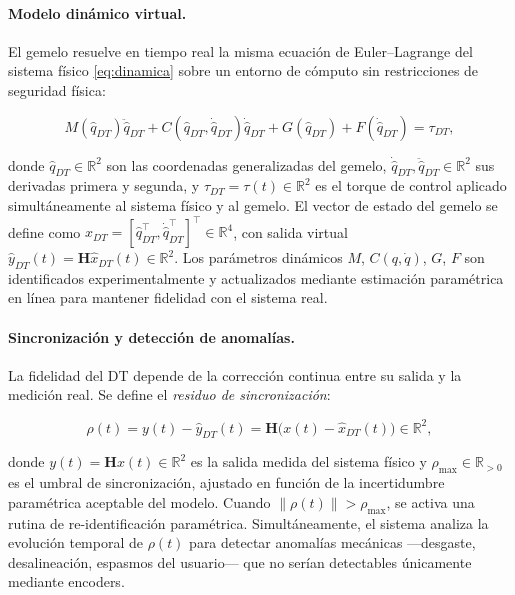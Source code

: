 \documentclass[a4paper,12pt]{article}
\begin{document}
\paragraph{Modelo dinámico virtual.}
El gemelo resuelve en tiempo real la misma ecuación de Euler–Lagrange del sistema físico \eqref{eq:dinamica} sobre un entorno de cómputo sin restricciones de seguridad física:

\begin{equation}
    M(\hat{q}_{DT})\ddot{\hat{q}}_{DT}
    + C(\hat{q}_{DT},\dot{\hat{q}}_{DT})\dot{\hat{q}}_{DT}
    + G(\hat{q}_{DT}) + F(\dot{\hat{q}}_{DT}) = \tau_{DT},
    \label{eq:dt_dinamica}
\end{equation}

\noindent donde $\hat{q}_{DT}\in\mathbb{R}^{2}$ son las coordenadas generalizadas del gemelo, $\dot{\hat{q}}_{DT},\ddot{\hat{q}}_{DT}\in\mathbb{R}^{2}$ sus derivadas primera y segunda, y $\tau_{DT}=\tau(t)\in\mathbb{R}^{2}$ es el torque de control aplicado simultáneamente al sistema físico y al gemelo. El vector de estado del gemelo se define como $\hat{x}_{DT}=[\hat{q}_{DT}^{\top},\dot{\hat{q}}_{DT}^{\top}]^{\top}\in\mathbb{R}^{4}$, con salida virtual $\hat{y}_{DT}(t)=\mathbf{H}\hat{x}_{DT}(t)\in\mathbb{R}^{2}$. Los parámetros dinámicos $M$, $C(q,\dot{q})$, $G$, $F$ son identificados experimentalmente y actualizados mediante estimación paramétrica en línea para mantener fidelidad con el sistema real.

\paragraph{Sincronización y detección de anomalías.}
La fidelidad del DT depende de la corrección continua entre su salida y la medición real. Se define el \textit{residuo de sincronización}:

\begin{equation}
    \rho(t) = y(t) - \hat{y}_{DT}(t) = \mathbf{H}\bigl(x(t)-\hat{x}_{DT}(t)\bigr)\in\mathbb{R}^{2},
    \label{eq:residuo}
\end{equation}

\noindent donde $y(t)=\mathbf{H}x(t)\in\mathbb{R}^{2}$ es la salida medida del sistema físico y $\rho_{\max}\in\mathbb{R}_{>0}$ es el umbral de sincronización, ajustado en función de la incertidumbre paramétrica aceptable del modelo. Cuando $\|\rho(t)\|>\rho_{\max}$, se activa una rutina de re-identificación paramétrica. Simultáneamente, el sistema analiza la evolución temporal de $\rho(t)$ para detectar anomalías mecánicas —desgaste, desalineación, espasmos del usuario— que no serían detectables únicamente mediante encoders.
\end{document}
